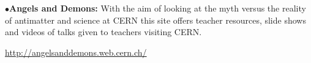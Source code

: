 
%






\medskip
\medskip
{}

\medskip

\item{$\bullet$}{\bf Angels and Demons:}
With the aim of looking at the myth versus the reality of antimatter and science at CERN this site offers teacher resources, slide shows and videos of talks given to teachers visiting CERN.
	\item{}\qquad\url{http://angelsanddemons.web.cern.ch/}

\medskip




